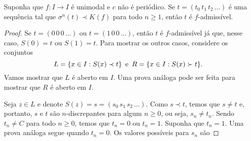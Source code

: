 \begin{theorem}
Suponha que $f: I \to I$ é unimodal e $c$ não é periódico. Se $t = (t_0\, t_1\, t_2\, \dots)$ é uma sequência tal que $\sigma^n(t) \prec K(f)$ para todo $n \geq 1$, então $t$ é $f$-admissível.
\end{theorem}

\begin{proof}
Se $t = (0\, 0\, 0\, \dots)$ ou $t = (1\, 0\, 0\, \dots)$, então $t$ é $f$-admissível já que, nesse caso, $S(0) = t$ ou $S(1) = t$. Para mostrar os outros casos, considere os conjuntos 
$$L = \{ x \in I : S(x) \prec t \} \text{\, e \,} R = \{ x \in I : S(x) \succ t \}.$$
Vamos mostrar que $L$ é aberto em $I$. Uma prova análoga pode ser feita para mostrar que $R$ é aberto em $I$.

Seja $z \in L$ e denote $S(z) = s = (s_0 \, s_1 \, s_2 \, \dots)$. Como $s \prec t$, temos que $s \neq t$ e, portanto, $s$ e $t$ são $n$-discrepantes para algum $n \geq 0$, ou seja, $s_n \neq t_n$. Sendo $t_n \neq C$ para todo $n \geq 0$, temos que $t_n = 0$ ou $t_n = 1$. Suponha que $t_n = 1$. Uma prova análoga segue quando $t_n = 0$. Os valores possíveis para $s_n$ são 
\end{proof}












